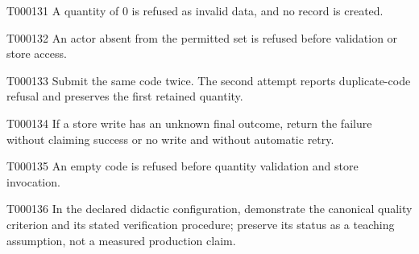 \documentclass[11pt,a4paper]{article}
\begin{document}
\begin{atlasparagraph}{T000131}
A quantity of 0 is refused as invalid data, and no record is created.
\end{atlasparagraph}
\par{}\hypertarget{AC-REQUEST-03}{}
\begin{atlasparagraph}{T000132}
An actor absent from the permitted set is refused before validation or store access.
\end{atlasparagraph}
\par{}\hypertarget{AC-REQUEST-04}{}
\begin{atlasparagraph}{T000133}
Submit the same code twice. The second attempt reports duplicate-code refusal and preserves the first retained quantity.
\end{atlasparagraph}
\par{}\hypertarget{AC-REQUEST-05}{}
\begin{atlasparagraph}{T000134}
If a store write has an unknown final outcome, return the failure without claiming success or no write and without automatic retry.
\end{atlasparagraph}
\par{}\hypertarget{AC-REQUEST-06}{}
\begin{atlasparagraph}{T000135}
An empty code is refused before quantity validation and store invocation.
\end{atlasparagraph}
\par{}\hypertarget{AC-REQUEST-SUBMIT-QUALITY}{}
\begin{atlasparagraph}{T000136}
In the declared didactic configuration, demonstrate the canonical quality criterion and its stated verification procedure; preserve its status as a teaching assumption, not a measured production claim.
\end{atlasparagraph}
\end{document}

